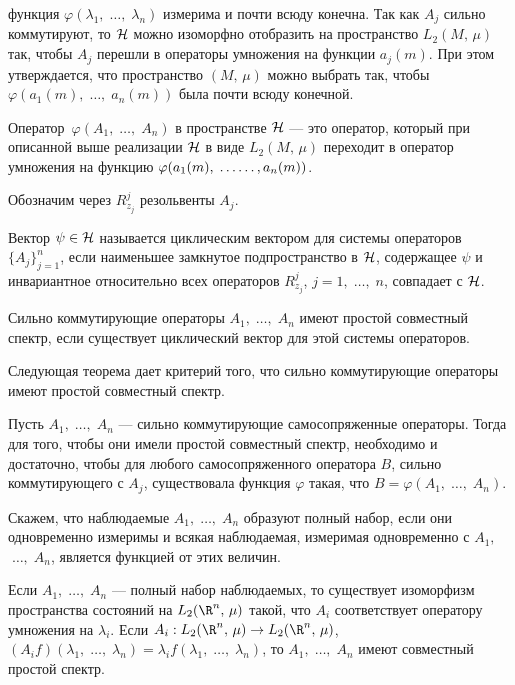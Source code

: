 \documentclass[a4paper
]{article}
\begin{document}
функция $\varphi(\lambda_1, \; \dots, \; \lambda_n)$ измерима и почти
всюду конечна. Так как $A_j$ сильно коммутируют, то ${\cal H}$ можно
изоморфно отобразить на пространство $L_2(M, \, \mu)$ так, чтобы
$A_j$ перешли в операторы умножения на функции $a_j(m)$. При этом
утверждается, что пространство $(M, \, \mu)$ можно выбрать так, чтобы
$\varphi(a_1(m), \; \dots, \; a_n(m))$ была почти всюду конечной.
\begin{Def}
Оператор $\,\varphi(A_1, \; \dots, \; A_n)$ в пространстве ${\cal H}$
--- это оператор, который при описанной выше реализации ${\cal H}$ в
виде $L_2(M, \, \mu)$ переходит в оператор умножения на функцию
$\varphi(a_1(m),\;\dots\break\dots, a_n(m))$.
\end{Def}
Обозначим через $R^j_{z_j}$ резольвенты $A_j$.
\begin{Def}
Вектор $\psi \in {\cal H}$ называется циклическим вектором для системы
операторов $\{A_j\}_{j=1}^n$, если наименьшее замкнутое подпространство в
${\cal H}$, содержащее $\psi$ и инвариантное относительно всех
операторов $R_{z_j}^j$, $j=1, \; \dots, \; n$, совпадает с ${\cal H}$.
\end{Def}
\begin{Def}
Сильно коммутирующие операторы $A_1, \; \dots, \; A_n$ имеют простой
совместный спектр, если существует циклический вектор для этой
системы операторов.
\end{Def}
Следующая теорема дает критерий того, что сильно коммутирующие операторы
имеют простой совместный спектр.
\begin{Trm}
Пусть $A_1, \; \dots, \; A_n$ --- сильно коммутирующие самосопряженные
операторы. Тогда для того, чтобы они имели простой совместный спектр, необходимо
и достаточно, чтобы для любого самосопряженного оператора $B$, сильно коммутирующего
с $A_j$, существовала функция $\varphi$ такая, что $B=\varphi(A_1, \; \dots, \;
A_n)$.
\end{Trm}
Скажем, что наблюдаемые $A_1, \; \dots, \; A_n$ образуют полный
набор, если они одновременно измеримы и всякая наблюдаемая,
измеримая одновременно с $A_1,$ $ \; \dots, \; A_n$, является
функцией от этих величин.
\begin{Trm}
Если $A_1, \; \dots, \; A_n$ --- полный набор наблюдаемых, то
существует изоморфизм пространства состояний на $L_2(\R^n, \, \mu)$
такой, что $A_i$ соответствует оператору умножения на $\lambda_i$.
Если $A_i:L_2(\R^n, \, \mu)\rightarrow L_2(\R^n, \, \mu)$, $(A_if)
(\lambda_1, \; \dots, \; \lambda_n)=\lambda _if(\lambda _1, \;
\dots, \; \lambda _n)$, то $A_1, \; \dots, \; A_n$ имеют совместный
простой спектр.
\end{Trm}
\end{document}
